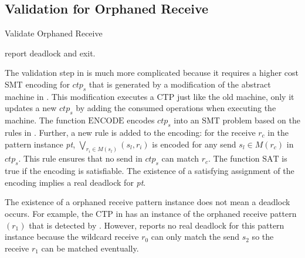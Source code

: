 \subsection{Validation for Orphaned Receive}

\begin{algorithm}
\caption{Validate Orphaned Receive}\label{algo:vorphaned}
\begin{algorithmic}[1]
\State report deadlock and exit.
\EndIf
\end{algorithmic}
\end{algorithm}

The validation step in  is much more complicated because it requires a higher cost SMT encoding for $\mathit{ctp_s}$ that is generated by a modification of the abstract machine in .
This modification executes a CTP just like the old machine, only it updates a new $\mathit{ctp_s}$ by adding the consumed operations when executing the machine.
The function $\mathrm{ENCODE}$ encodes $\mathit{ctp_s}$ into an SMT problem based on the rules in \cite{DBLP:conf/kbse/HuangMM13}. Further, a new rule is added to the encoding: for the receive $\mathit{r_c}$ in the pattern instance \textit{pt}, $\bigvee_{\mathit{r_i}\in\mathit{M}(\mathit{s_l})}(\mathit{s_l},\mathit{r_i})$ is encoded for any send $\mathit{s_l}\in\mathit{M}(\mathit{r_c})$ in $\mathit{ctp_s}$. This rule ensures that no send in $\mathit{ctp_s}$ can match $\mathit{r_c}$. The function $\mathrm{SAT}$ is true if the encoding is satisfiable. The existence of a satisfying assignment of the encoding implies a real deadlock for \textit{pt}. 

\examplefigtwo

The existence of a orphaned receive pattern instance does not mean a deadlock occurs. For example, the CTP in  has an instance of the orphaned receive pattern $(r_1)$ that is detected by . However,  reports no real deadlock for this pattern instance because the wildcard receive $r_0$ can only match the send $s_2$ so the receive $r_1$ can be matched eventually.

